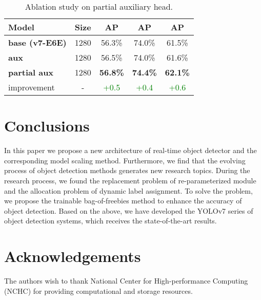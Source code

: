 \documentclass[10pt,twocolumn,letterpaper]{article}
\begin{document}
		\begin{table}[h]
			\centering
			\begin{threeparttable}[h]
				\footnotesize
				\caption{Ablation study on partial auxiliary head.}
				\label{table:paux}
				\setlength\tabcolsep{5.0pt}
				\begin{tabular}{lcccc}
					\toprule
					\textbf{Model} & \textbf{Size} & \textbf{AP} & \textbf{AP} & \textbf{AP} \\	
					\midrule
					\textbf{base (v7-E6E)} & 1280 & 56.3\% & 74.0\% & 61.5\% \\
					\textbf{aux} & 1280 & 56.5\% & 74.0\% & 61.6\% \\
					\textbf{partial aux} & 1280 & \textbf{56.8\%} & \textbf{74.4\%} & \textbf{62.1\%} \\
					improvement & - & \textcolor{green}{+0.5} & \textcolor{green}{+0.4} & \textcolor{green}{+0.6} \\
					\bottomrule
				\end{tabular}
\end{threeparttable}
		\vspace{-4mm}
		\end{table}
	
		\section{Conclusions}
		
		In this paper we propose a new architecture of real-time object detector and the corresponding model scaling method.  Furthermore, we find that the evolving process of object detection methods generates new research topics.  During the research process, we found the replacement problem of re-parameterized module and the allocation problem of dynamic label assignment.  To solve the problem, we propose the trainable bag-of-freebies method to enhance the accuracy of object detection.  Based on the above, we have developed the YOLOv7 series of object detection systems, which receives the state-of-the-art results.
	

		\section{Acknowledgements}
		
		The authors wish to thank National Center for High-performance Computing (NCHC) for providing computational and storage resources.
		
\end{document}
